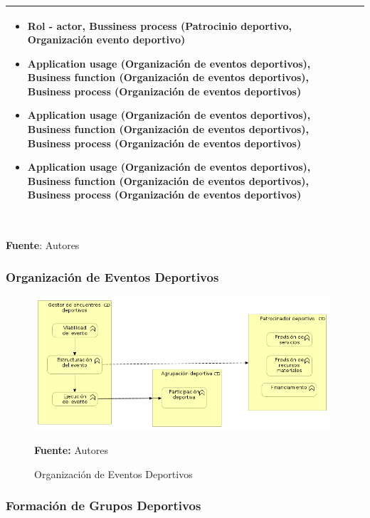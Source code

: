 \begin{table}[!htb]
\begin{center}
{\begin{tabular}{|p{7cm}|p{4cm}|}
\begin{itemize}
				\item Rol - actor, Bussiness process (Patrocinio deportivo, Organización evento deportivo)
				\item Application usage (Organización de eventos deportivos), Business function (Organización de eventos deportivos), Business process (Organización de eventos deportivos)
				\item Application usage (Organización de eventos deportivos), Business function (Organización de eventos deportivos), Business process (Organización de eventos deportivos)
				\item Application usage (Organización de eventos deportivos), Business function (Organización de eventos deportivos), Business process (Organización de eventos deportivos)
			\end{itemize} 
			\\
			\hline
		\end{tabular}
		} \\
		\textbf{Fuente}: Autores
	\end{center}
\end{table}

\subsubsection{Organización de Eventos Deportivos}

\begin{figure}[!htb]
  \begin{center}
    \includegraphics[width=11cm]{./imagenes/business_functions/organizacioneventosdeportivos.png}
    \caption{Organización de Eventos Deportivos}
    \label{fig:organizacion_eventos_deportivos}
    \textbf{Fuente:}  Autores
  \end{center}
\end{figure}

\subsubsection{Formación de Grupos Deportivos}

